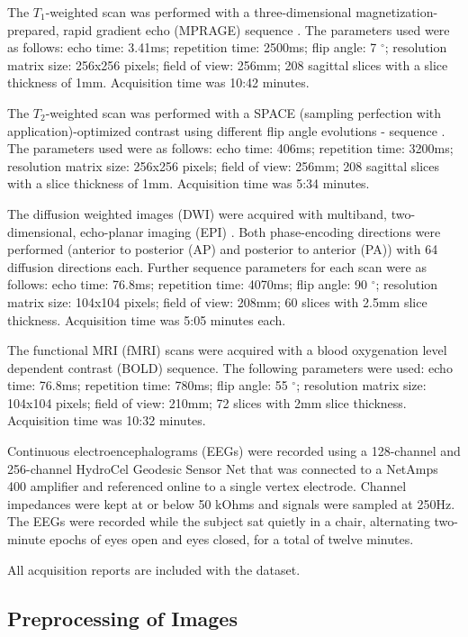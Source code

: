 The $T_1$-weighted scan was performed with a three-dimensional magnetization-prepared, rapid gradient echo (MPRAGE) sequence \cite{ref:mprage}. The parameters used were as follows: echo time: 3.41ms; repetition time: 2500ms; flip angle: 7 $^{\circ}$; resolution matrix size: 256x256 pixels; field of view: 256mm; 208 sagittal slices with a slice thickness of 1mm. Acquisition time was 10:42 minutes.

The $T_2$-weighted scan was performed with a SPACE (sampling perfection with application)-optimized contrast using different flip angle evolutions - sequence \cite{ref:space}. The parameters used were as follows: echo time: 406ms; repetition time: 3200ms; resolution matrix size: 256x256 pixels; field of view: 256mm; 208 sagittal slices with a slice thickness of 1mm. Acquisition time was 5:34 minutes.

The diffusion weighted images (DWI) were acquired with multiband, two-dimensional, echo-planar imaging (EPI) \cite{ref:epi}. Both phase-encoding directions were performed (anterior to posterior (AP) and posterior to anterior (PA)) with 64 diffusion directions each. Further sequence parameters for each scan were as follows: echo time: 76.8ms; repetition time: 4070ms; flip angle: 90 $^{\circ}$; resolution matrix size: 104x104 pixels; field of view: 208mm; 60 slices with 2.5mm slice thickness. Acquisition time was 5:05 minutes each.

The functional MRI (fMRI) scans were acquired with a blood oxygenation level dependent contrast (BOLD) sequence. The following parameters were used: echo time: 76.8ms; repetition time: 780ms; flip angle: 55 $^{\circ}$; resolution matrix size: 104x104 pixels; field of view: 210mm; 72 slices with 2mm slice thickness. Acquisition time was 10:32 minutes.

Continuous electroencephalograms (EEGs) were recorded using a 128-channel and 256-channel HydroCel Geodesic Sensor Net that was connected to a NetAmps 400 amplifier and referenced online to a single vertex electrode. Channel impedances were kept at or below 50 kOhms and signals were sampled at 250Hz. The EEGs were recorded while the subject sat quietly in a chair, alternating two-minute epochs of eyes open and eyes closed, for a total of twelve minutes.

All acquisition reports are included with the dataset.

\subsection{Preprocessing of Images}
\label{sec:preprocess}

